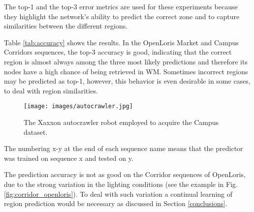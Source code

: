 \documentclass[letterpaper, 10 pt, conference]{ieeeconf}  %
\begin{document}
The top-1 and the top-3 error metrics are used for these experiments because they highlight the network’s ability to predict the correct zone and to capture similarities between the different regions.

Table \ref{tab:accuracy} shows the results. In the OpenLoris Market and Campus Corridors sequences, the top-3 accuracy is good, indicating that the correct region is almost always among the three most likely predictions and therefore its nodes have a high chance of being retrieved in WM. Sometimes incorrect regions may be predicted as top-1, however, this behavior is even desirable in some cases, to deal with region similarities. 

\begin{figure}[b]
    \centering
    \texttt{[image: images/autocrawler.jpg]}
    \caption{The Xaxxon autocrawler robot employed to acquire the Campus dataset.}
    \label{fig:autocrawler}
\end{figure}

\begin{table}[ht] 
\caption{Top-1 and Top-3 region prediction accuracy}
\label{tab:accuracy}
The numbering x-y at the end of each sequence name means that the predictor was trained on sequence x and tested on y.
\vspace{-0.3cm}
\end{table}
The prediction accuracy is not as good on the Corridor sequences of OpenLoris, due to the strong variation in the lighting conditions (see the example in Fig. \ref{fig:corridor_openloris}). To deal with such variation a continual learning of region prediction would be necessary as discussed in Section \ref{conclusions}. 
\end{document}
